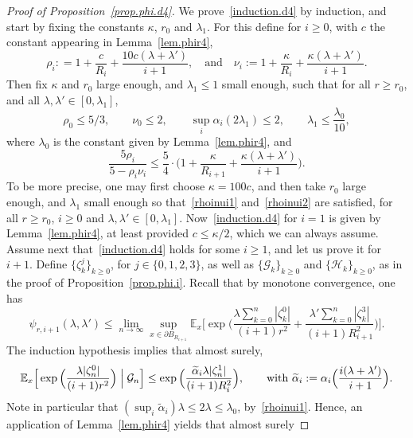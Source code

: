 \documentclass[JEP,XML,SOM,Unicode,NoFloatCountersInSection,published]{cedram}
\theoremstyle{plain}
\theoremstyle{definition}
\newcommand{\1}{{\text{\Large $\mathfrak 1$}}}
\begin{document}
\begin{proof}[Proof of Proposition~\ref{prop.phi.d4}]
We prove~\eqref{induction.d4} by induction, and start by fixing the constants $\kappa$, $r_0$ and $\lambda_1$. For this define for $i\ge 0$, with $c$ the constant appearing in Lemma~\ref{lem.phir4},
\[
\rho_i : = 1+\frac{c}{R_i} + \frac{10c(\lambda + \lambda')}{i+1},\quad \text{and}\quad \nu_i:= 1+\frac{\kappa }{R_i} + \frac{\kappa(\lambda + \lambda')}{i+1}.
\]
Then fix $\kappa$ and $r_0$ large enough, and $\lambda_1\le 1$ small enough, such that for all $r\ge r_0$, and all $\lambda, \lambda'\in[0,\lambda_1]$,
\begin{equation}\label{rhoinui1}
\rho_0 \le 5/3, \qquad \nu_0\le 2, \qquad \sup_i \alpha_i(2\lambda_1)\le 2, \qquad \lambda_1\le \frac{\lambda_0}{10},
\end{equation}
where $\lambda_0$ is the constant given by Lemma~\ref{lem.phir4}, and
\begin{equation}\label{rhoinui2}
\frac{5\rho_i}{5-\rho_i\nu_i} \le \frac{5}{4}\cdot \Big(1+\frac{\kappa }{R_{i+1}} + \frac{\kappa(\lambda+\lambda')}{i+1}\Big).
\end{equation}
To be more precise, one may first choose $\kappa=100c$, and then take $r_0$ large enough, and $\lambda_1$ small enough
so that~\eqref{rhoinui1} and~\eqref{rhoinui2} are satisfied, for all $r\ge r_0$, $i\ge 0$ and $\lambda, \lambda'\in[0,\lambda_1]$.
Now~\eqref{induction.d4} for $i=1$ is given by Lemma~\ref{lem.phir4}, at least provided
$c\le \kappa/2$, which we can always assume.
Assume next that~\eqref{induction.d4} holds for some $i\ge 1$, and let us prove it for $i+1$. Define $\{\zeta_k^j\}_{k\ge 0}$, for $j\in \{0,1,2,3\}$,
as well as $\{\mathcal G_k\}_{k\ge 0}$ and $\{\mathcal H_k\}_{k\ge 0}$, as in the proof of Proposition~\ref{prop.phi.i}.
Recall that by monotone convergence, one has
\begin{equation*}%
\psi_{r,i+1}(\lambda,\lambda') \le \lim_{n \to \infty} \sup_{x\in \partial B_{R_{i+1}}}
\mathbb E_x\Big[\exp\Big(\frac{\lambda\sum_{k=0}^n |\zeta_k^0|}{(i+1)r^2}+\frac{\lambda'\sum_{k=0}^n |\zeta^3_k|}{(i+1)R_{i+1}^2}\Big)\Big].
\end{equation*}
The induction hypothesis implies that almost surely,
\[
\mathbb E_x\Big[\exp\Big(\frac{\lambda |\zeta_n^0|}{(i+1)r^2}\Big) \Bigm|\mathcal G_n \Big] \le
\exp\Big(\frac{\widetilde \alpha_i \lambda|\zeta_n^1|}{(i+1)R_i^2}\Big),\qquad \text{with }\widetilde \alpha_i: = \alpha_i\Big(\frac{i(\lambda+\lambda')}{i+1}\Big).
\]
Note in particular that $(\sup_i \widetilde \alpha_i)\lambda \le 2\lambda \le \lambda_0$, by~\eqref{rhoinui1}. Hence, an application of Lemma~\ref{lem.phir4} yields that almost surely

\end{proof}
\end{document}
